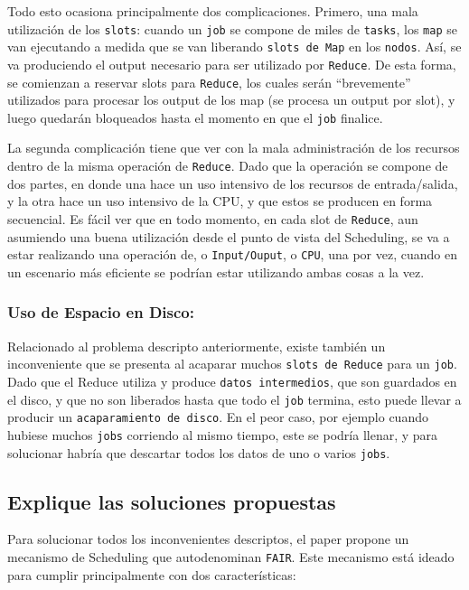 \documentclass[11pt, a4paper, twoside]{article}
\begin{document}
Todo esto ocasiona principalmente dos complicaciones. Primero, una mala
utilización de los \texttt{slots}: cuando un \texttt{job} se compone de miles de
\texttt{tasks}, los \texttt{map} se van ejecutando a medida que se van liberando
\texttt{slots de Map} en los \texttt{nodos}. Así, se va produciendo el output
necesario para ser utilizado por \texttt{Reduce}. De esta forma, se comienzan a
reservar slots para \texttt{Reduce}, los cuales serán ``brevemente'' utilizados
para procesar los output de los map (se procesa un output por slot), y luego
quedarán bloqueados hasta el momento en que el \texttt{job} finalice.

La segunda complicación tiene que ver con la mala administración de los recursos
dentro de la misma operación de \texttt{Reduce}. Dado que la operación se
compone de dos partes, en donde una hace un uso intensivo de los recursos de
entrada/salida, y la otra hace un uso intensivo de la CPU, y que estos se
producen en forma secuencial. Es fácil ver que en todo momento, en cada slot de
\texttt{Reduce}, aun asumiendo una buena utilización desde el punto de vista del
Scheduling, se va a estar realizando una operación de, o \texttt{Input/Ouput}, o
\texttt{CPU}, una por vez, cuando en un escenario más eficiente se podrían estar
utilizando ambas cosas a la vez.

\subsubsection{Uso de Espacio en Disco:}

Relacionado al problema descripto anteriormente, existe también un inconveniente
que se presenta al acaparar muchos \texttt{slots de Reduce} para un
\texttt{job}. Dado que el Reduce utiliza y produce \texttt{datos intermedios},
que son guardados en el disco, y que no son liberados hasta que todo el
\texttt{job} termina, esto puede llevar a producir un \texttt{acaparamiento de
disco}. En el peor caso, por ejemplo cuando hubiese muchos \texttt{jobs}
corriendo al mismo tiempo, este se podría llenar, y para solucionar habría que
descartar todos los datos de uno o varios \texttt{jobs}.

\clearpage
\subsection {\footnotesize Explique las soluciones propuestas}
\label{investigacion-6}

Para solucionar todos los inconvenientes descriptos, el paper propone un
mecanismo de Scheduling que autodenominan \texttt{FAIR}. Este mecanismo está
ideado para cumplir principalmente con dos características:
\end{document}
